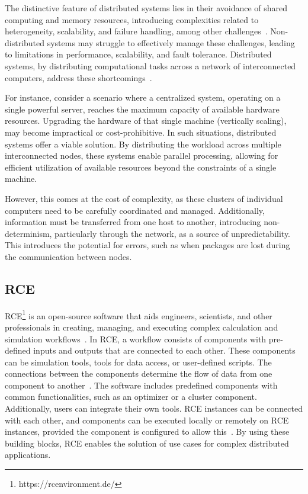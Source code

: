 The distinctive feature of distributed systems lies in their avoidance of shared computing and memory resources, introducing complexities related to heterogeneity, scalability, and failure handling, among other challenges~\cite{coulouris2005distributed}. Non-distributed systems may struggle to effectively manage these challenges, leading to limitations in performance, scalability, and fault tolerance. Distributed systems, by distributing computational tasks across a network of interconnected computers, address these shortcomings~\cite{coulouris2005distributed}.

For instance, consider a scenario where a centralized system, operating on a single powerful server, reaches the maximum capacity of available hardware resources. Upgrading the hardware of that single machine (vertically scaling), may become impractical or cost-prohibitive. In such situations, distributed systems offer a viable solution. By distributing the workload across multiple interconnected nodes, these systems enable parallel processing, allowing for efficient utilization of available resources beyond the constraints of a single machine. 

However, this comes at the cost of complexity, as these clusters of individual computers need to be carefully coordinated and managed. Additionally, information must be transferred from one host to another, introducing non-determinism, particularly through the network, as a source of unpredictability. This introduces the potential for errors, such as when packages are lost during the communication between nodes.

\subsection{\acl{RCE}}
\label{subsec:rce}
\acf{RCE}\footnote{https://rcenvironment.de/} is an open-source software that aids engineers, scientists, and other professionals in creating, managing, and executing complex calculation and simulation workflows~\cite{BODEN2021100759,rceDevGuide10x}. In RCE, a workflow consists of components with pre-defined inputs and outputs that are connected to each other. These components can be simulation tools, tools for data access, or user-defined scripts. The connections between the components determine the flow of data from one component to another~\cite{BODEN2021100759,rceDevGuide10x}. The software includes predefined components with common functionalities, such as an optimizer or a cluster component. Additionally, users can integrate their own tools. RCE instances can be connected with each other, and components can be executed locally or remotely on RCE instances, provided the component is configured to allow this~\cite{BODEN2021100759,rceDevGuide10x}. By using these building blocks, RCE enables the solution of use cases for complex distributed applications.

